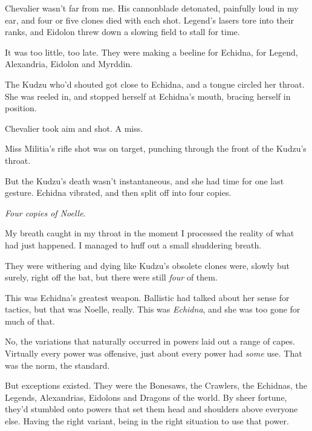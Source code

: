 Chevalier wasn't far from me.  His cannonblade detonated, painfully loud in my ear, and four or five clones died with each shot.  Legend's lasers tore into their ranks, and Eidolon threw down a slowing field to stall for time.



It was too little, too late.  They were making a beeline for Echidna, for Legend, Alexandria, Eidolon and Myrddin.



The Kudzu who'd shouted got close to Echidna, and a tongue circled her throat.  She was reeled in, and stopped herself at Echidna's mouth, bracing herself in position.



Chevalier took aim and shot.  A miss.



Miss Militia's rifle shot was on target, punching through the front of the Kudzu's throat.



But the Kudzu's death wasn't instantaneous, and she had time for one last gesture.  Echidna vibrated, and then split off into four copies.



\emph{Four copies of Noelle}.



My breath caught in my throat in the moment I processed the reality of what had just happened.  I managed to huff out a small shuddering breath.



They were withering and dying like Kudzu's obsolete clones were, slowly but surely, right off the bat, but there were still \emph{four} of them.



This was Echidna's greatest weapon.  Ballistic had talked about her sense for tactics, but that was Noelle, really.  This was \emph{Echidna}, and she was too gone for much of that.



No, the variations that naturally occurred in powers laid out a range of capes.  Virtually every power was offensive, just about every power had \emph{some} use.  That was the norm, the standard.



But exceptions existed.  They were the Bonesaws, the Crawlers, the Echidnas, the Legends, Alexandrias, Eidolons and Dragons of the world.  By sheer fortune, they'd stumbled onto powers that set them head and shoulders above everyone else.  Having the right variant, being in the right situation to use that power.




